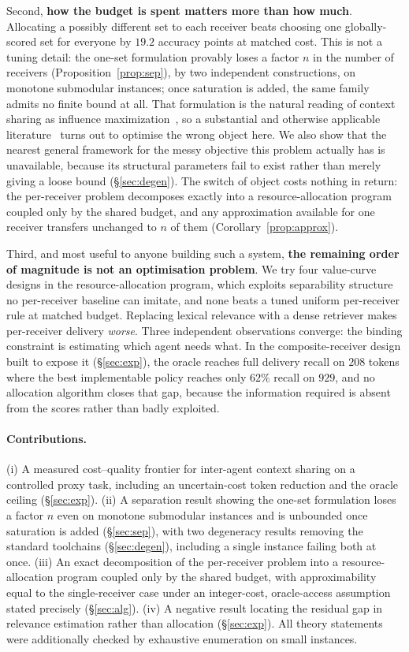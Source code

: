 \documentclass[sigconf,anonymous]{aamas}
\theoremstyle{remark}
\begin{document}
Second, \textbf{how the budget is spent matters more than how much}.
Allocating a possibly different set to each receiver beats choosing one
globally-scored set for everyone by $19.2$ accuracy points at matched
cost. This is not a tuning detail: the one-set formulation provably loses a
factor $n$ in the number of receivers (Proposition~\ref{prop:sep}), by
two independent constructions, on monotone submodular instances; once
saturation is added, the same family admits no finite bound at all.
That formulation is the natural reading of context sharing as
influence maximization~\cite{kempe2003}, so a substantial and
otherwise applicable literature~\cite{borgs2014,tang2015,eim2025} turns
out to optimise the wrong object here. We also show that the nearest general
framework for the messy objective this problem actually has is
unavailable, because its structural parameters fail to exist rather
than merely giving a loose bound (\S\ref{sec:degen}). The switch of
object costs nothing in return: the per-receiver problem decomposes
exactly into a resource-allocation program coupled only by the shared
budget, and any approximation available for one receiver transfers
unchanged to $n$ of them (Corollary~\ref{prop:approx}).

Third, and most useful to anyone building such a system,
\textbf{the remaining order of magnitude is not an optimisation
problem}. We try four value-curve designs in the resource-allocation
program, which exploits separability structure no per-receiver
baseline can imitate, and none beats a tuned uniform per-receiver rule
at matched budget.
Replacing lexical relevance with a dense retriever makes per-receiver
delivery \emph{worse}. Three independent observations converge: the
binding constraint is estimating which agent needs what. In the
composite-receiver design built to expose it (\S\ref{sec:exp}), the
oracle reaches full delivery recall on $208$ tokens where the best
implementable policy reaches only $62\%$ recall on $929$, and no
allocation algorithm closes that gap, because the information required
is absent from the scores rather than badly exploited.

\paragraph{Contributions.} (i) A measured cost--quality frontier for
inter-agent context sharing on a controlled proxy task, including an
uncertain-cost token reduction and the oracle ceiling
(\S\ref{sec:exp}). (ii) A separation result showing the one-set
formulation loses a factor $n$ even on monotone submodular instances
and is unbounded once saturation is added (\S\ref{sec:sep}), with two
degeneracy results removing the standard toolchains
(\S\ref{sec:degen}), including a single instance failing both at once.
(iii) An exact decomposition of the per-receiver problem into a
resource-allocation program coupled only by the shared budget, with
approximability equal to the single-receiver case under an
integer-cost, oracle-access assumption stated precisely
(\S\ref{sec:alg}). (iv) A negative result locating the residual gap in
relevance estimation rather than allocation (\S\ref{sec:exp}). All
theory statements were additionally checked by exhaustive enumeration
on small instances.
\end{document}
